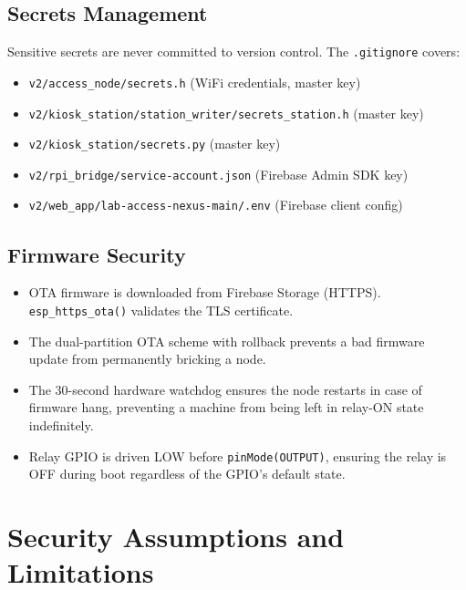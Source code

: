 \subsection{Secrets Management}

Sensitive secrets are never committed to version control. The \texttt{.gitignore} covers:
\begin{itemize}[leftmargin=1.5em,noitemsep]
    \item \texttt{v2/access\_node/secrets.h} (WiFi credentials, master key)
    \item \texttt{v2/kiosk\_station/station\_writer/secrets\_station.h} (master key)
    \item \texttt{v2/kiosk\_station/secrets.py} (master key)
    \item \texttt{v2/rpi\_bridge/service-account.json} (Firebase Admin SDK key)
    \item \texttt{v2/web\_app/lab-access-nexus-main/.env} (Firebase client config)
\end{itemize}

\subsection{Firmware Security}

\begin{itemize}[leftmargin=1.5em]
    \item OTA firmware is downloaded from Firebase Storage (HTTPS). \texttt{esp\_https\_ota()} validates the TLS certificate.
    \item The dual-partition OTA scheme with rollback prevents a bad firmware update from permanently bricking a node.
    \item The 30-second hardware watchdog ensures the node restarts in case of firmware hang, preventing a machine from being left in relay-ON state indefinitely.
    \item Relay GPIO is driven LOW before \texttt{pinMode(OUTPUT)}, ensuring the relay is OFF during boot regardless of the GPIO's default state.
\end{itemize}

\section{Security Assumptions and Limitations}

